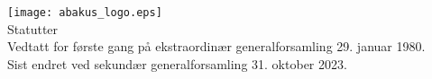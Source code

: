 \documentclass{article}
\begin{document}
\begin{center}
  \texttt{[image: abakus\_logo.eps]} \\
  \Large{Statutter} \\
  \vspace{0.4cm}
  \normalsize{Vedtatt for første gang på ekstraordinær generalforsamling 29. januar 1980. \\
              Sist endret ved sekundær generalforsamling 31. oktober 2023.}
\end{center}

\newpage
\tableofcontents
\newpage


\end{document}
